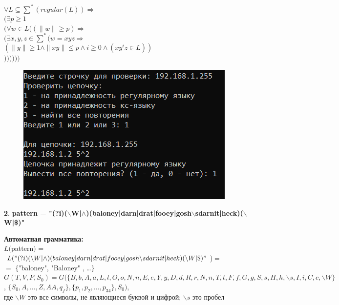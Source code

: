 \documentclass[a4paper,10pt]{article}
\begin{document}
	\begin{center}
		$\forall L \subseteq \sum^{*} (regular(L)) \Rightarrow$ \\
		$( \exists p \ge 1 $ \\
		$(\forall w \in L ((\|w\| \ge p) \Rightarrow $ \\
		$( \exists x, y, z \in \sum^{*} (w = xyz \Rightarrow$ \\
		$(\|y\| \ge 1 \wedge \|xy\| \le p \wedge i \ge 0 \wedge (xy^{i}z \in L )) $ \\
		$)))))) $\\
	\end{center}
	\vspace*{5mm}
	\begin{figure}[h]
		\centering
		\includegraphics[]{1.png}
		\label{fig:mpr}
	\end{figure}
	\vspace*{5mm}
	\begin{center}
		\textbf{2}. \textbf{pattern = "(?i)($\backslash$W|$\wedge$)(baloney|darn|drat|fooey|gosh$\backslash$sdarnit|heck)($\backslash$W|\$)" }
	\end{center}
	\textbf{Автоматная грамматика:} \\[3mm]
	\hspace*{5mm} $L($pattern$)$ = $L("(?i)(\backslash W|\wedge)(baloney|darn|drat|fooey|gosh \backslash sdarnit|heck)( \backslash W|\$)"$)$ = $ \\
	\hspace*{5mm}$=$ $\{$"baloney"{}, "Baloney"{} , \dots $\}$ \\
	\hspace*{5mm} $G(T, V, P, S_0) = G(\{B, b, A, a, L, l, O, o, N, n, E, e, Y, y, D, d, R, r, N, n, T, t, F, f, G, g, S, s, H, h, \backslash s, I, i, C, c, \backslash W\}$,
	\hspace*{5mm}$ \{S_0, A, \dots, Z, AA, q_f\}, \{p_1, p_2, \dots, p_{34}\}, S_0)$, \\\hspace*{5mm}где $\backslash W$ это все символы, не являющиеся буквой и цифрой; $\backslash s$ это пробел \\[5mm]
	
\end{document}
